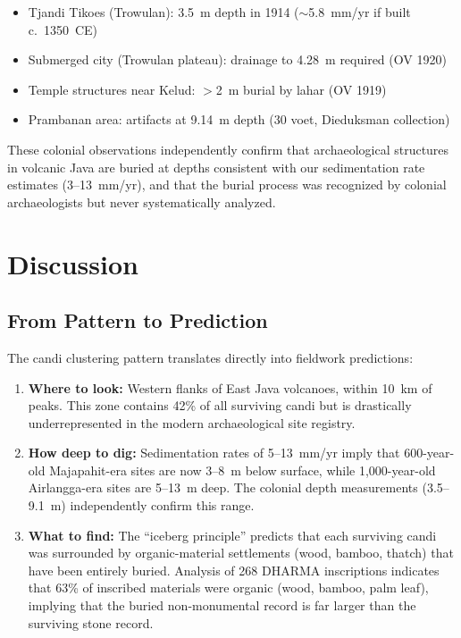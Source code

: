 \documentclass[12pt,a4paper]{article}
\begin{document}
\begin{itemize}
    \item Tjandi Tikoes (Trowulan): 3.5~m depth in 1914 ($\sim$5.8~mm/yr if built c.\ 1350~CE)
    \item Submerged city (Trowulan plateau): drainage to 4.28~m required (OV 1920)
    \item Temple structures near Kelud: $>$2~m burial by lahar (OV 1919)
    \item Prambanan area: artifacts at 9.14~m depth (30 voet, Dieduksman collection)
\end{itemize}

These colonial observations independently confirm that archaeological structures in volcanic Java are buried at depths consistent with our sedimentation rate estimates (3--13~mm/yr), and that the burial process was recognized by colonial archaeologists but never systematically analyzed.

\section{Discussion}

\subsection{From Pattern to Prediction}

The candi clustering pattern translates directly into fieldwork predictions:

\begin{enumerate}
    \item \textbf{Where to look:} Western flanks of East Java volcanoes, within 10~km of peaks. This zone contains 42\% of all surviving candi but is drastically underrepresented in the modern archaeological site registry.
    \item \textbf{How deep to dig:} Sedimentation rates of 5--13~mm/yr imply that 600-year-old Majapahit-era sites are now 3--8~m below surface, while 1,000-year-old Airlangga-era sites are 5--13~m deep. The colonial depth measurements (3.5--9.1~m) independently confirm this range.
    \item \textbf{What to find:} The ``iceberg principle'' predicts that each surviving candi was surrounded by organic-material settlements (wood, bamboo, thatch) that have been entirely buried. Analysis of 268 DHARMA inscriptions indicates that 63\% of inscribed materials were organic (wood, bamboo, palm leaf), implying that the buried non-monumental record is far larger than the surviving stone record.
\end{enumerate}
\end{document}
